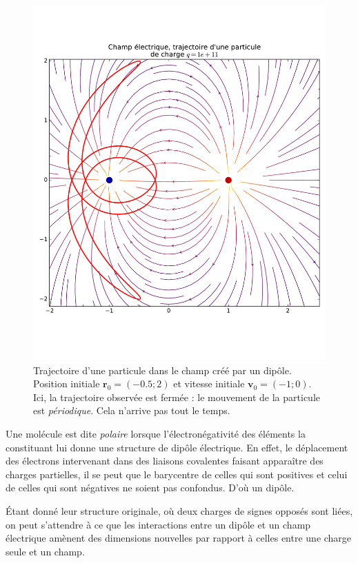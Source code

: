 \documentclass{article}
\newcommand{\vv}[1]{\symbf{#1}}
\theoremstyle{definition}
\theoremstyle{remark}
\begin{document}
\begin{figure}[h]
	\centering
	\includegraphics[height=0.6\textheight]{parts/electrostat/traj_x0_-05_2_v0_-1_0.pdf}
	\caption{Trajectoire d'une particule dans le champ créé par un dipôle. Position initiale $\vv{r}_0 = (\num{-0.5};2)$ et vitesse initiale $\vv{v}_0=(-1;0)$. Ici, la trajectoire observée est fermée : le mouvement de la particule est \textit{périodique}. Cela n'arrive pas tout le temps.}
\end{figure}

Une molécule est dite \textit{polaire} lorsque l'électronégativité des éléments la constituant lui donne une structure de dipôle électrique. En effet, le déplacement des électrons intervenant dans des liaisons covalentes faisant apparaître des charges partielles, il se peut que le barycentre de celles qui sont positives et celui de celles qui sont négatives ne soient pas confondus. D'où un dipôle.


Étant donné leur structure originale, où deux charges de signes opposés sont liées, on peut s'attendre à ce que les interactions entre un dipôle et un champ électrique amènent des dimensions nouvelles par rapport à celles entre une charge seule et un champ.
\end{document}
